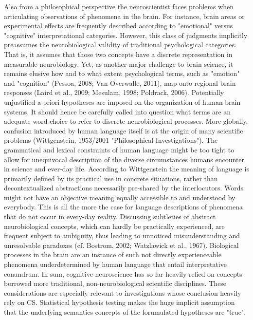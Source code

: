 \documentclass[authoryear,review,3p]{elsarticle}
\begin{document}
Also from a philosophical perspective
the neuroscientist faces problems when articulating observations of
phenomena in the brain.
%
For instance, brain areas or experimental effects are frequently
described according to "emotional" versus "cognitive"
interpretational categories.
However, this class of judgments implicitly preassumes
the neurobiological validity of traditional psychological categories.
That is, it assumes that those two concepts have
a discrete representation in measurable neurobiology.
Yet, as another major challenge to brain science,
it remains elusive how and to what extent psychological terms,
such as "emotion" and "cognition" (Pessoa, 2008; Van Overwalle, 2011),
map onto regional brain responses
(Laird et al., 2009; Mesulam, 1998; Poldrack, 2006). 
Potentially unjustified a-priori hypotheses are imposed
on the organization of human brain systems.
%
It should hence be carefully called into question what terms
are an adequate word choice to refer to discrete
neurobiological processes.
More globally,
confusion introduced by human language itself is at the origin
of many scientific problems
(Wittgenstein, 1953/2001 "Philosophical Investigations").
The grammatical and lexical constraints of human language might be
too tight to allow for unequivocal description of the diverse
circumstances humans encounter in science and ever-day life.
According to Wittgenstein the meaning of language is primarily
defined by its practical use in concrete situations,
rather than decontextualized abstractions necessarily pre-shared
by the interlocutors.
Words might not have an objective meaning
equally accessible to and understood by everybody.
This is all the more the case for language descriptions
of phenomena that do not occur in every-day reality.
Discussing subtleties of abstract neurobiological concepts,
which can hardly be practically experienced,
are frequent subject to ambiguity, thus leading to
unnoticed misunderstanding and unresolvable paradoxes
(cf. Bostrom, 2002; Watzlawick et al., 1967).
Biological processes in the brain are an instance of
such not directly experienceable phenomena underdetermined
by human language that entail interpretative conundrum.
%
In sum,
cognitive neuroscience has so far heavily relied on concepts
borrowed more traditional, non-neurobiological scientific disciplines.
These considerations are especially relevant to investigations
whose conclusion heavily rely on CS.
Statistical hypothesis testing makes the huge implicit assumption that
the underlying semantics concepts of the forumulated hypotheses are "true".
\end{document}
